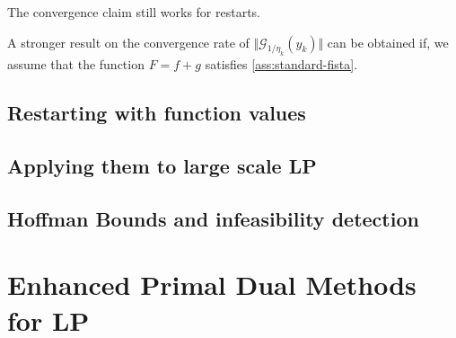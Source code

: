 \documentclass[12pt]{report}
\begin{document}
        \begin{remark}
            The convergence claim still works for restarts. 
        \end{remark}
        \par
        A stronger result on the convergence rate of $\Vert \mathcal G_{1/\eta_k}(y_k)\Vert$ can be obtained if, we assume that the function $F=f + g$ satisfies \ref{ass:standard-fista}. 
    \section{Restarting with function values}
        
    \section{Applying them to large scale LP}
    
    \section{Hoffman Bounds and infeasibility detection}
    
\chapter{Enhanced Primal Dual Methods for LP}
    






\end{document}
